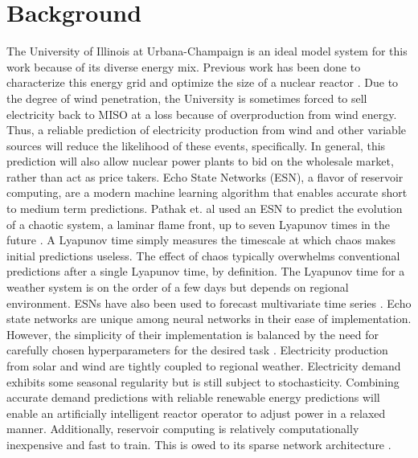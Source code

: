 \section{Background}
The University of Illinois at Urbana-Champaign is an ideal model system for
this work because of its diverse energy mix. Previous work has been done to
characterize this energy grid and optimize the size of a nuclear reactor \cite{dotson_optimal_2020}. Due to the degree of wind penetration, the University is sometimes
forced to sell electricity back to MISO at a loss because of overproduction
from wind energy. Thus, a reliable prediction of electricity production from
wind and other variable sources will reduce the likelihood of these events,
specifically. In general, this prediction will also allow nuclear power plants
to bid on the wholesale market, rather than act as price takers.
Echo State Networks (ESN), a flavor of reservoir computing, are a modern
machine learning algorithm that enables accurate short
to medium term predictions. Pathak et. al used an \acrshort{ESN} to predict the
evolution of a chaotic system, a laminar flame front, up to seven Lyapunov
times in the future \cite{pathak_model-free_2018, wikner_combining_2020}. A
Lyapunov time simply measures the timescale at which chaos makes initial
predictions useless. The effect of chaos typically overwhelms conventional
predictions after a single Lyapunov time, by definition.
The Lyapunov time for a weather system is on the order of a few days but
depends on regional environment. \acrshort{ESN}s have also been used to
forecast multivariate time series
\cite{bianchi_reservoir_2020}. Echo state networks are unique among neural
networks in their ease of implementation. However, the simplicity of their
implementation is balanced by the need for carefully chosen hyperparameters for
the desired task \cite{lukosevicius_practical_2012}.
Electricity production from solar and wind are tightly coupled to regional
weather. Electricity demand exhibits some seasonal regularity but is still
subject to stochasticity. Combining accurate demand predictions with reliable
renewable energy predictions will enable an artificially intelligent reactor
operator to adjust power in a relaxed manner. Additionally, reservoir computing
is relatively computationally inexpensive and fast to train. This is owed to its
sparse network architecture \cite{pathak_model-free_2018,
wikner_combining_2020, vannitsem_predictability_2017}.
